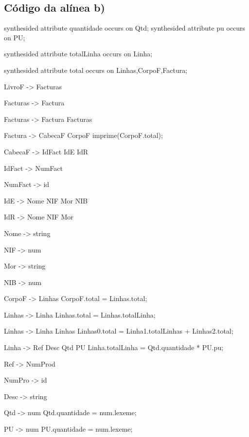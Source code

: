 \documentclass[11pt,a4paper]{article}
\begin{document}
\subsection{Código da alínea b)}
\begin{code_txt} 
synthesided attribute quantidade occurs on Qtd;
synthesided attribute pu occurs on PU;

synthesided attribute totalLinha occurs on Linha;

synthesided attribute total occurs on Linhas,CorpoF,Factura;



LivroF -> Facturas

Facturas -> Factura

Facturas -> Factura Facturas

Factura -> CabecaF CorpoF {imprime(CorpoF.total);}

CabecaF -> IdFact IdE IdR

IdFact -> NumFact

NumFact -> id

IdE -> Nome NIF Mor NIB

IdR -> Nome NIF Mor

Nome -> string

NIF -> num

Mor -> string

NIB -> num

CorpoF -> Linhas {CorpoF.total = Linhas.total;}

Linhas -> Linha {Linhas.total = Linhas.totalLinha;}

Linhas -> Linha Linhas {Linhas0.total = Linha1.totalLinhas + Linhas2.total;}

Linha -> Ref Desc Qtd PU {Linha.totalLinha = Qtd.quantidade * PU.pu;}

Ref -> NumProd

NumPro -> id

Desc -> string

Qtd -> num  { Qtd.quantidade = num.lexeme;}

PU -> num	{ PU.quantidade = num.lexeme;}




\end{code_txt} 
\newpage
\end{document}
